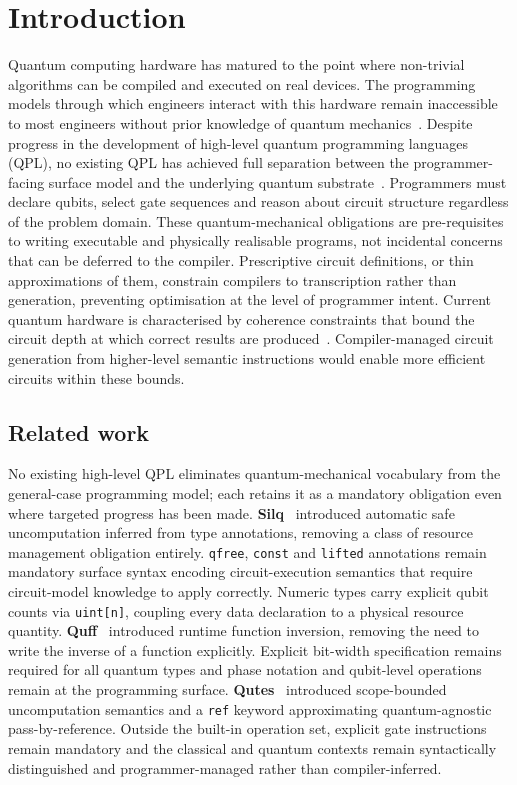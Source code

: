 \section{Introduction}\label{sec:pre_confirmation:introduction}
Quantum computing hardware has matured to the point where non-trivial algorithms can be compiled and executed on real devices.
The programming models through which engineers interact with this hardware remain inaccessible to most engineers without prior knowledge of quantum mechanics~\cite{ferreira2024qplusage}.
Despite progress in the development of high-level quantum programming languages (QPL), no existing QPL has achieved full separation between the programmer-facing surface model and the underlying quantum substrate~\cite{DiMatteo2024AbstractionHierarchy, yuan2025foundationalabstractions}.
Programmers must declare qubits, select gate sequences and reason about circuit structure regardless of the problem domain.
These quantum-mechanical obligations are pre-requisites to writing executable and physically realisable programs, not incidental concerns that can be deferred to the compiler.
Prescriptive circuit definitions, or thin approximations of them, constrain compilers to transcription rather than generation, preventing optimisation at the level of programmer intent.
Current quantum hardware is characterised by coherence constraints that bound the circuit depth at which correct results are produced~\cite{nielsen2000quantum}.
Compiler-managed circuit generation from higher-level semantic instructions would enable more efficient circuits within these bounds.

\subsection{Related work}\label{subsec:pre_confirmation:introduction:related_work}
No existing high-level QPL eliminates quantum-mechanical vocabulary from the general-case programming model; each retains it as a mandatory obligation even where targeted progress has been made.
\textbf{Silq}~\cite{bichsel2020silq} introduced automatic safe uncomputation inferred from type annotations, removing a class of resource management obligation entirely.
\texttt{qfree}, \texttt{const} and \texttt{lifted} annotations remain mandatory surface syntax encoding circuit-execution semantics that require circuit-model knowledge to apply correctly.
Numeric types carry explicit qubit counts via \texttt{uint[n]}, coupling every data declaration to a physical resource quantity.
\textbf{Quff}~\cite{wright2024quff} introduced runtime function inversion, removing the need to write the inverse of a function explicitly.
Explicit bit-width specification remains required for all quantum types and phase notation and qubit-level operations remain at the programming surface.
\textbf{Qutes}~\cite{faro2025qutes} introduced scope-bounded uncomputation semantics and a \texttt{ref} keyword approximating quantum-agnostic pass-by-reference.
Outside the built-in operation set, explicit gate instructions remain mandatory and the classical and quantum contexts remain syntactically distinguished and programmer-managed rather than compiler-inferred.

